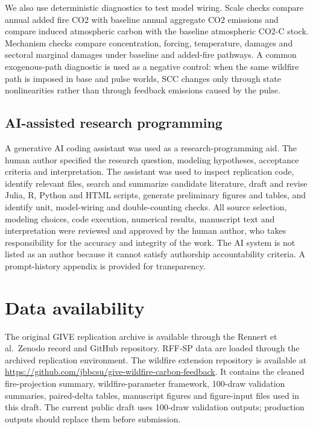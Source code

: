 \documentclass[12pt]{article}
\begin{document}
We also use deterministic diagnostics to test model wiring. Scale checks
compare annual added fire CO2 with baseline annual aggregate CO2
emissions and compare induced atmospheric carbon with the baseline
atmospheric CO2-C stock. Mechanism checks compare concentration,
forcing, temperature, damages and sectoral marginal damages under
baseline and added-fire pathways. A common exogenous-path diagnostic is
used as a negative control: when the same wildfire path is imposed in
base and pulse worlds, SCC changes only through state nonlinearities
rather than through feedback emissions caused by the pulse.

\subsection{AI-assisted research
programming}\label{ai-assisted-research-programming}

A generative AI coding assistant was used as a research-programming aid.
The human author specified the research question, modeling hypotheses,
acceptance criteria and interpretation. The assistant was used to
inspect replication code, identify relevant files, search and summarize
candidate literature, draft and revise Julia, R, Python and HTML
scripts, generate preliminary figures and tables, and identify unit,
model-wiring and double-counting checks. All source selection, modeling
choices, code execution, numerical results, manuscript text and
interpretation were reviewed and approved by the human author, who takes
responsibility for the accuracy and integrity of the work. The AI system
is not listed as an author because it cannot satisfy authorship
accountability criteria. A prompt-history appendix is provided for
transparency.

\section{Data availability}\label{data-availability}

The original GIVE replication archive is available through the Rennert
et al.~Zenodo record and GitHub repository. RFF-SP data are loaded
through the archived replication environment. The wildfire extension
repository is available at
\url{https://github.com/jbbcsu/give-wildfire-carbon-feedback}. It
contains the cleaned fire-projection summary, wildfire-parameter
framework, 100-draw validation summaries, paired-delta tables,
manuscript figures and figure-input files used in this draft. The
current public draft uses 100-draw validation outputs; production
outputs should replace them before submission.
\end{document}
